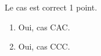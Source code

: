 %
%
    Le cas est correct \hfill 1 point.
    \begin{enumerate}
        \item Oui, cas CAC.
        \item Oui, cas CCC.
    \end{enumerate}
